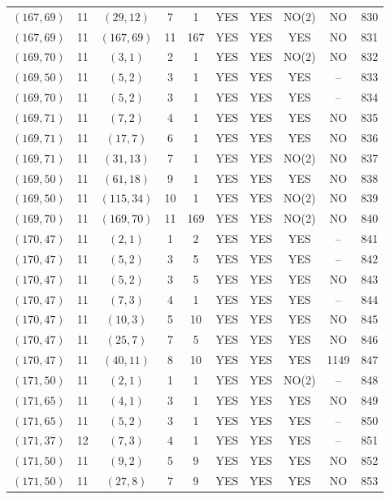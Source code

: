 \begin{longtable}{|c|c|c|c|c|c|c|c|c|c|}
$(167, 69)$ & 11 & $(29, 12)$ & 7 & 1 & YES & YES & NO(2) & NO & 830\\
$(167, 69)$ & 11 & $(167, 69)$ & 11 & 167 & YES & YES & YES & NO & 831\\
$(169, 70)$ & 11 & $(3, 1)$ & 2 & 1 & YES & YES & NO(2) & NO & 832\\
$(169, 50)$ & 11 & $(5, 2)$ & 3 & 1 & YES & YES & YES & -- & 833\\
$(169, 70)$ & 11 & $(5, 2)$ & 3 & 1 & YES & YES & YES & -- & 834\\
$(169, 71)$ & 11 & $(7, 2)$ & 4 & 1 & YES & YES & YES & NO & 835\\
$(169, 71)$ & 11 & $(17, 7)$ & 6 & 1 & YES & YES & YES & NO & 836\\
$(169, 71)$ & 11 & $(31, 13)$ & 7 & 1 & YES & YES & NO(2) & NO & 837\\
$(169, 50)$ & 11 & $(61, 18)$ & 9 & 1 & YES & YES & YES & NO & 838\\
$(169, 50)$ & 11 & $(115, 34)$ & 10 & 1 & YES & YES & NO(2) & NO & 839\\
$(169, 70)$ & 11 & $(169, 70)$ & 11 & 169 & YES & YES & NO(2) & NO & 840\\
$(170, 47)$ & 11 & $(2, 1)$ & 1 & 2 & YES & YES & YES & -- & 841\\
$(170, 47)$ & 11 & $(5, 2)$ & 3 & 5 & YES & YES & YES & -- & 842\\
$(170, 47)$ & 11 & $(5, 2)$ & 3 & 5 & YES & YES & YES & NO & 843\\
$(170, 47)$ & 11 & $(7, 3)$ & 4 & 1 & YES & YES & YES & -- & 844\\
$(170, 47)$ & 11 & $(10, 3)$ & 5 & 10 & YES & YES & YES & NO & 845\\
$(170, 47)$ & 11 & $(25, 7)$ & 7 & 5 & YES & YES & YES & NO & 846\\
$(170, 47)$ & 11 & $(40, 11)$ & 8 & 10 & YES & YES & YES & 1149 & 847\\
$(171, 50)$ & 11 & $(2, 1)$ & 1 & 1 & YES & YES & NO(2) & -- & 848\\
$(171, 65)$ & 11 & $(4, 1)$ & 3 & 1 & YES & YES & YES & NO & 849\\
$(171, 65)$ & 11 & $(5, 2)$ & 3 & 1 & YES & YES & YES & -- & 850\\
$(171, 37)$ & 12 & $(7, 3)$ & 4 & 1 & YES & YES & YES & -- & 851\\
$(171, 50)$ & 11 & $(9, 2)$ & 5 & 9 & YES & YES & YES & NO & 852\\
$(171, 50)$ & 11 & $(27, 8)$ & 7 & 9 & YES & YES & YES & NO & 853\\

\end{longtable}
